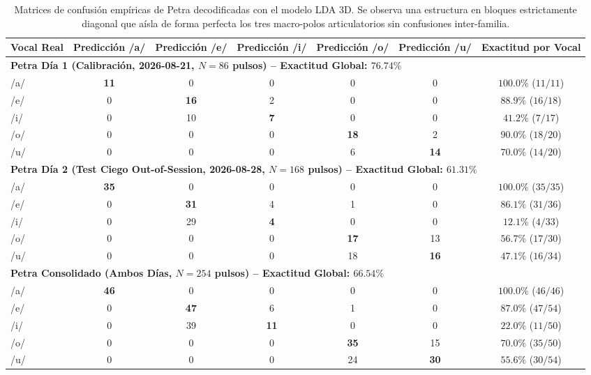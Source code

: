 \documentclass[11pt,a4paper,openany]{book}
\theoremstyle{definition}
\begin{document}
\begin{table}[H]
\centering
\small
\begin{tabular}{lcccccc}
\hline
\textbf{Vocal Real} & \textbf{Predicción /a/} & \textbf{Predicción /e/} & \textbf{Predicción /i/} & \textbf{Predicción /o/} & \textbf{Predicción /u/} & \textbf{Exactitud por Vocal} \\
\hline
\multicolumn{7}{l}{\textbf{Petra Día 1 (Calibración, 2026-08-21, $N = 86$ pulsos) -- Exactitud Global: $76.74\%$}} \\
/a/ & \textbf{11} & 0 & 0 & 0 & 0 & $\mathbf{100.0\%}$ ($11/11$) \\
/e/ & 0 & \textbf{16} & 2 & 0 & 0 & $\mathbf{88.9\%}$ ($16/18$) \\
/i/ & 0 & 10 & \textbf{7} & 0 & 0 & $\mathbf{41.2\%}$ ($7/17$) \\
/o/ & 0 & 0 & 0 & \textbf{18} & 2 & $\mathbf{90.0\%}$ ($18/20$) \\
/u/ & 0 & 0 & 0 & 6 & \textbf{14} & $\mathbf{70.0\%}$ ($14/20$) \\
\hline
\multicolumn{7}{l}{\textbf{Petra Día 2 (Test Ciego Out-of-Session, 2026-08-28, $N = 168$ pulsos) -- Exactitud Global: $61.31\%$}} \\
/a/ & \textbf{35} & 0 & 0 & 0 & 0 & $\mathbf{100.0\%}$ ($35/35$) \\
/e/ & 0 & \textbf{31} & 4 & 1 & 0 & $\mathbf{86.1\%}$ ($31/36$) \\
/i/ & 0 & 29 & \textbf{4} & 0 & 0 & $\mathbf{12.1\%}$ ($4/33$) \\
/o/ & 0 & 0 & 0 & \textbf{17} & 13 & $\mathbf{56.7\%}$ ($17/30$) \\
/u/ & 0 & 0 & 0 & 18 & \textbf{16} & $\mathbf{47.1\%}$ ($16/34$) \\
\hline
\multicolumn{7}{l}{\textbf{Petra Consolidado (Ambos Días, $N = 254$ pulsos) -- Exactitud Global: $66.54\%$}} \\
/a/ & \textbf{46} & 0 & 0 & 0 & 0 & $\mathbf{100.0\%}$ ($46/46$) \\
/e/ & 0 & \textbf{47} & 6 & 1 & 0 & $\mathbf{87.0\%}$ ($47/54$) \\
/i/ & 0 & 39 & \textbf{11} & 0 & 0 & $\mathbf{22.0\%}$ ($11/50$) \\
/o/ & 0 & 0 & 0 & \textbf{35} & 15 & $\mathbf{70.0\%}$ ($35/50$) \\
/u/ & 0 & 0 & 0 & 24 & \textbf{30} & $\mathbf{55.6\%}$ ($30/54$) \\
\hline
\end{tabular}
\caption{Matrices de confusión empíricas de Petra decodificadas con el modelo LDA 3D. Se observa una estructura en bloques estrictamente diagonal que aísla de forma perfecta los tres macro-polos articulatorios sin confusiones inter-familia.}
\label{tab:matrices_confusion_petra_dos_dias}
\end{table}
\end{document}
